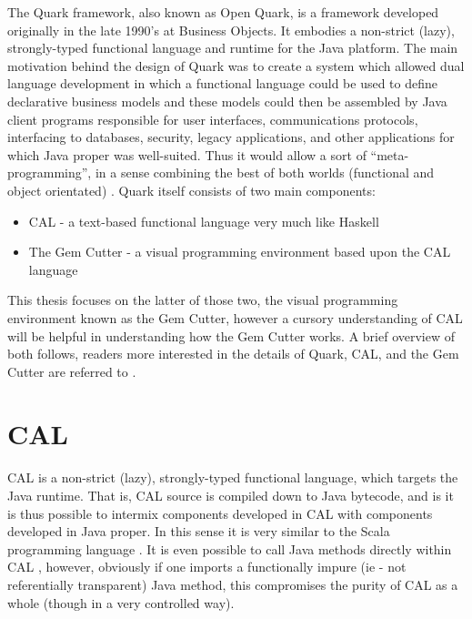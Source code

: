 \label{chapter:quark}

The Quark framework, also known as Open Quark, is a framework developed originally in the late 1990's at Business Objects.
It embodies a non-strict (lazy), strongly-typed functional language and runtime for the Java platform.  The main motivation behind the design of Quark was to create a system which allowed dual language development in which a functional language could be used to define declarative business models and these models could then be assembled by Java client programs responsible for user interfaces, communications protocols, interfacing to databases, security, legacy applications, and other applications for which Java proper was well-suited.  Thus it would allow a sort of ``meta-programming'', in a sense combining the best of both worlds (functional and object orientated) \cite{evans07}.  Quark itself consists of two main components:

\begin{itemize}
	\item CAL - a text-based functional language very much like Haskell
	\item The Gem Cutter - a visual programming environment based upon the CAL language
\end{itemize}

This thesis focuses on the latter of those two, the visual programming environment known as the Gem Cutter, however a cursory understanding of CAL will be helpful in understanding how the Gem Cutter works.  A brief overview of both follows, readers more interested in the details of Quark, CAL, and the Gem Cutter are referred to \cite{evans06, evans07}.

\section{CAL}

CAL is a non-strict (lazy), strongly-typed functional language, which targets the Java runtime.  That is, CAL source is compiled down to Java bytecode, and is it is thus possible to intermix components developed in CAL with components developed in Java proper.  In this sense it is very similar to the Scala programming language \cite{scala}.  It is even possible to call Java methods directly within CAL \cite{javaMeetsQuark}, however, obviously if one imports a functionally impure (ie - not referentially transparent) Java method, this compromises the purity of CAL as a whole (though in a very controlled way).  

